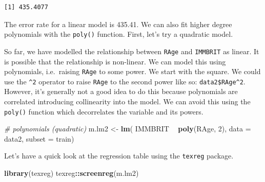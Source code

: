 \documentclass[]{article}
\newenvironment{Shaded}{\begin{snugshade}}{\end{snugshade}}
\newcommand{\CommentTok}[1]{\textcolor[rgb]{0.56,0.35,0.01}{\textit{#1}}}
\newcommand{\DataTypeTok}[1]{\textcolor[rgb]{0.13,0.29,0.53}{#1}}
\newcommand{\DecValTok}[1]{\textcolor[rgb]{0.00,0.00,0.81}{#1}}
\newcommand{\KeywordTok}[1]{\textcolor[rgb]{0.13,0.29,0.53}{\textbf{#1}}}
\newcommand{\NormalTok}[1]{#1}
\newcommand{\OperatorTok}[1]{\textcolor[rgb]{0.81,0.36,0.00}{\textbf{#1}}}
\newcommand{\StringTok}[1]{\textcolor[rgb]{0.31,0.60,0.02}{#1}}
\begin{document}
\begin{Shaded}
\end{Shaded}

\begin{verbatim}
[1] 435.4077
\end{verbatim}

The error rate for a linear model is 435.41. We can also fit higher degree polynomials with the \texttt{poly()} function. First, let's try a quadratic model.

So far, we have modelled the relationship between \texttt{RAge} and \texttt{IMMBRIT} as linear. It is possible that the relationship is non-linear. We can model this using polynomials, i.e.~raising \texttt{RAge} to some power. We start with the square. We could use the \texttt{\^{}2} operator to raise \texttt{RAge} to the second power like so: \texttt{data2\$RAge\^{}2}. However, it's generally not a good idea to do this because polynomials are correlated introducing collinearity into the model. We can avoid this using the \texttt{poly()} function which decorrelates the variable and its powers.

\begin{Shaded}
\begin{Highlighting}[]
\CommentTok{# polynomials (quadratic)}
\NormalTok{m.lm2 <-}\StringTok{ }\KeywordTok{lm}\NormalTok{( IMMBRIT }\OperatorTok{~}\StringTok{ }\KeywordTok{poly}\NormalTok{(RAge, }\DecValTok{2}\NormalTok{), }\DataTypeTok{data =}\NormalTok{ data2, }\DataTypeTok{subset =}\NormalTok{ train)}
\end{Highlighting}
\end{Shaded}

Let's have a quick look at the regression table using the \texttt{texreg} package.

\begin{Shaded}
\begin{Highlighting}[]
\KeywordTok{library}\NormalTok{(texreg)}
\NormalTok{texreg}\OperatorTok{::}\KeywordTok{screenreg}\NormalTok{(m.lm2)}
\end{Highlighting}
\end{Shaded}
\end{document}
